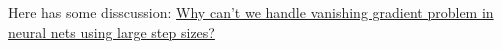 \documentclass{subfiles}
\begin{document}
Here has some disscussion: \href{https://stats.stackexchange.com/questions/299369/why-cant-we-handle-vanishing-gradient-problem-in-neural-nets-using-large-step-s}{Why can't we handle vanishing gradient problem in neural nets using large step sizes?}
\end{document}
